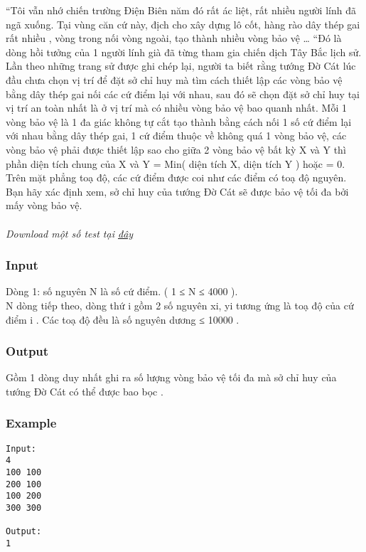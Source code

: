 



   “Tôi vẫn nhớ chiến trường Điện Biên năm đó rất ác liệt, rất nhiều người lính đã ngã xuống. Tại vùng căn cứ này, địch cho xây dựng lô cốt, hàng rào dây thép gai rất nhiều , vòng trong nối vòng ngoài, tạo thành nhiều vòng bảo vệ … “Đó là dòng hồi tưởng của 1 người lính già đã từng tham gia chiến dịch Tây Bắc lịch sử. Lần theo những trang sử được ghi chép lại, người ta biết rằng tướng Đờ Cát lúc đầu chưa chọn vị trí để đặt sở chỉ huy mà tìm cách thiết lập các vòng bảo vệ bằng dây thép gai nối các cứ điểm lại với nhau, sau đó sẽ chọn đặt sở chỉ huy tại vị trí an toàn nhất là ở vị trí mà có nhiều vòng bảo vệ bao quanh nhất. Mỗi 1 vòng bảo vệ là 1 đa giác không tự cắt tạo thành bằng cách nối 1 số cứ điểm lại với nhau bằng dây thép gai, 1 cứ điểm thuộc về không quá 1 vòng bảo vệ, các vòng bảo vệ phải được thiết lập sao cho giữa 2 vòng bảo vệ bất kỳ X và Y thì phần diện tích chung của X và Y = Min( diện tích X, diện tích Y ) hoặc = 0. Trên mặt phẳng toạ độ, các cứ điểm được coi như các điểm có toạ độ nguyên. Bạn hãy xác định xem, sở chỉ huy của tướng Đờ Cát sẽ được bảo vệ tối đa bởi mấy vòng bảo vệ.   
\\
\\\textit{    Download một số test tại    \href{http://vn.spoj.pl/content/MILITARY.rar}{     đây    }}

\subsubsection{   Input  }

   Dòng 1: số nguyên N là số cứ điểm. ( 1 ≤ N ≤ 4000 ).   
\\   N dòng tiếp theo, dòng thứ i gồm 2 số nguyên xi, yi tương ứng là toạ độ của cứ điểm i . Các toạ độ đều là số nguyên dương ≤ 10000 .  

\subsubsection{   Output  }

   Gồm 1 dòng duy nhất ghi ra số lượng vòng bảo vệ tối đa mà sở chỉ huy của tướng Đờ Cát có thể được bao bọc .  

\subsubsection{   Example  }
\begin{verbatim}
Input:
4
100 100
200 100
100 200
300 300

Output:
1
\end{verbatim}